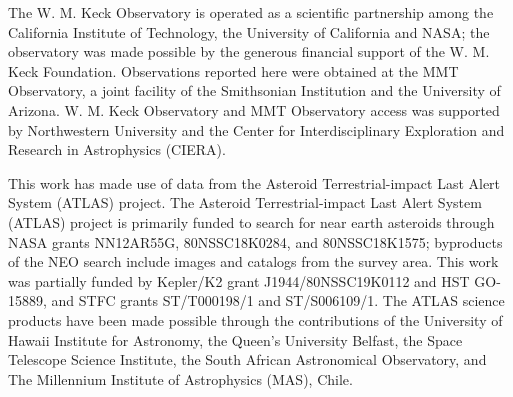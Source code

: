 \documentclass[twocolumn]{aastex631}
\begin{document}
\begin{CJK*}{UTF8}{gbsn}
The W. M. Keck Observatory is operated as a scientific partnership among the California Institute of Technology, the University of California and NASA; the observatory was made possible by the generous financial support of the W. M. Keck Foundation. Observations reported here were obtained at the MMT Observatory, a joint facility of the Smithsonian Institution and the University of Arizona. W. M. Keck Observatory and MMT Observatory access was supported by Northwestern University and the Center for Interdisciplinary Exploration and Research in Astrophysics (CIERA).

This work has made use of data from the Asteroid Terrestrial-impact Last Alert System (ATLAS) project. The Asteroid Terrestrial-impact Last Alert System (ATLAS) project is primarily funded to search for near earth asteroids through NASA grants NN12AR55G, 80NSSC18K0284, and 80NSSC18K1575; byproducts of the NEO search include images and catalogs from the survey area. This work was partially funded by Kepler/K2 grant J1944/80NSSC19K0112 and HST GO-15889, and STFC grants ST/T000198/1 and ST/S006109/1. The ATLAS science products have been made possible through the contributions of the University of Hawaii Institute for Astronomy, the Queen's University Belfast, the Space Telescope Science Institute, the South African Astronomical Observatory, and The Millennium Institute of Astrophysics (MAS), Chile.









\end{CJK*}
\end{document}
